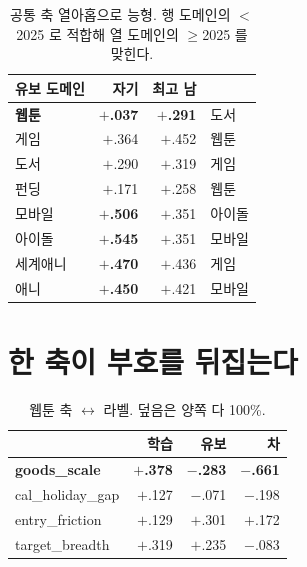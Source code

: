\documentclass[10pt]{article}
\begin{document}
\begin{table}[t]
\centering\tsize
\caption{공통 축 열아홉으로 능형. 행 도메인의 $<$2025 로 적합해 열 도메인의
$\ge$2025 를 맞힌다.}
\begin{tabular}{lrrl}
\toprule
유보 도메인 & 자기 & 최고 남 & \\
\midrule
\textbf{웹툰} & \textbf{$+$.037} & \textbf{$+$.291} & 도서 \\
게임 & $+$.364 & $+$.452 & 웹툰 \\
도서 & $+$.290 & $+$.319 & 게임 \\
펀딩 & $+$.171 & $+$.258 & 웹툰 \\
\midrule
모바일 & \textbf{$+$.506} & $+$.351 & 아이돌 \\
아이돌 & \textbf{$+$.545} & $+$.351 & 모바일 \\
세계애니 & \textbf{$+$.470} & $+$.436 & 게임 \\
애니 & \textbf{$+$.450} & $+$.421 & 모바일 \\
\bottomrule
\end{tabular}
\end{table}



\section{한 축이 부호를 뒤집는다}

\begin{table}[t]
\centering\tsize
\caption{웹툰 축 $\leftrightarrow$ 라벨. 덮음은 양쪽 다 100\%.}
\begin{tabular}{lrrr}
\toprule
& 학습 & 유보 & 차 \\
\midrule
\textbf{goods\_scale} & \textbf{$+$.378} & \textbf{$-$.283} & \textbf{$-$.661} \\
cal\_holiday\_gap & $+$.127 & $-$.071 & $-$.198 \\
entry\_friction & $+$.129 & $+$.301 & $+$.172 \\
target\_breadth & $+$.319 & $+$.235 & $-$.083 \\
\bottomrule
\end{tabular}
\end{table}
\end{document}
